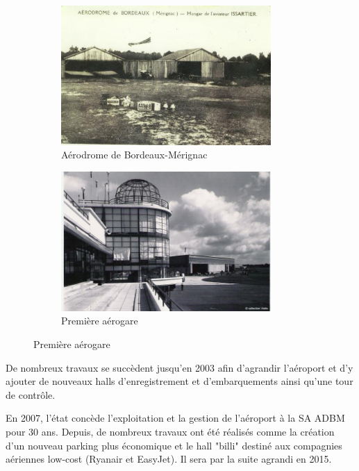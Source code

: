 \begin{figure}[hbt!]
    \begin{subfigure}{0.5\textwidth}
      \centering
      \includegraphics[width=8cm]{Images/premier.jpg}  
      \caption{Aérodrome de Bordeaux-Mérignac}
      \label{fig:aérodrome}
    \end{subfigure}
    \begin{subfigure}{0.5\textwidth}
      \centering
      \includegraphics[width=8cm]{Images/premiere_aerogare.jpg}  
      \caption{Première aérogare}
      \label{fig:premiereAerogare}
    \end{subfigure}
\end{figure}


\newpage
De nombreux travaux se succèdent jusqu'en 2003 afin d'agrandir l'aéroport et d'y ajouter de nouveaux halls d'enregistrement et d'embarquements ainsi qu'une tour de contrôle.

En 2007, l'état concède l'exploitation et la gestion de l'aéroport à la SA ADBM pour 30 ans. Depuis, de nombreux travaux ont été réalisés comme la création d'un nouveau parking plus économique et le hall "billi" destiné aux compagnies aériennes low-cost (Ryanair et EasyJet). Il sera par la suite agrandi en 2015.\newline

